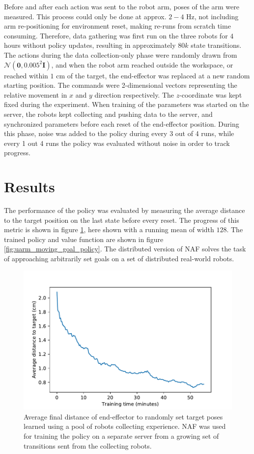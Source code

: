 Before and after each action was sent to the robot arm, poses of the arm were
measured. This process could only be done at approx. $2-4$ Hz, not including
arm re-positioning for environment reset, making re-runs from scratch time
consuming. Therefore, data gathering was first run on the three robots for $4$
hours without policy updates, resulting in approximately $80k$ state
transitions. The actions during the data collection-only phase were randomly
drawn from $\mathcal{N}(\mathbf{0}, 0.005^2 \mathbf{I})$, and when the robot
arm reached outside the workspace, or reached within $1$ cm of the target, the
end-effector was replaced at a new random starting position. The commands were
2-dimensional vectors representing the relative movement in $x$ and $y$
direction respectively. The $z$-coordinate was kept fixed during the
experiment. When training of the parameters was started on the server, the
robots kept collecting and pushing data to the server, and synchronized
parameters before each reset of the end-effector position. During this phase,
noise was added to the policy during every 3 out of 4 runs, while every 1 out 4
runs the policy was evaluated without noise in order to track progress.

\section{Results}

The performance of the policy was evaluated by measuring the average distance
to the target position on the last state before every reset. The progress of
this metric is shown in figure \ref{fig:uarm_moving_goal_progress}, here shown
with a running mean of width $128$. The trained policy and value function are
shown in figure \ref{fig:uarm_moving_goal_policy}. The distributed version of
NAF solves the task of approaching arbitrarily set goals on a set of
distributed real-world robots.

\begin{figure}[h!]
    \centering
    \includegraphics[width=0.50 \textwidth]{res/uarm_moving_goal_progress.pdf}

    \caption{Average final distance of end-effector to randomly set target
    poses learned using a pool of robots collecting experience. NAF was used
    for training the policy on a separate server from a growing set of
    transitions sent from the collecting robots.}
    \label{fig:uarm_moving_goal_progress}
    
\end{figure}

